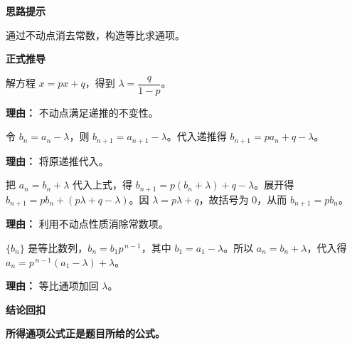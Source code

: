\begin{proofbox}
	\textbf{\textcolor{CProof}{思路提示}}

	通过不动点消去常数，构造等比求通项。

	\medskip
	\textbf{\textcolor{CProof}{正式推导}}
	\begin{description}[style=nextline, leftmargin=2.8em, labelsep=0.5em, itemsep=0.55em]
		\item[\textbf{步骤一（求不动点）：}] 解方程 $x = p x + q$，得到 $\lambda = \dfrac{q}{1-p}$。
			\par\textbf{理由：}
			不动点满足递推的不变性。

		\item[\textbf{步骤二（构造关系）：}] 令 $b_n = a_n - \lambda$，则 $b_{n+1} = a_{n+1} - \lambda$。代入递推得 $b_{n+1} = p a_n + q - \lambda$。
			\par\textbf{理由：}
			将原递推代入。

		\item[\textbf{步骤三（消常推导）：}] 把 $a_n = b_n + \lambda$ 代入上式，得 $b_{n+1} = p(b_n + \lambda) + q - \lambda$。展开得 $b_{n+1} = p b_n + (p\lambda + q - \lambda)$。因 $\lambda = p\lambda + q$，故括号为 $0$，从而 $b_{n+1} = p b_n$。
			\par\textbf{理由：}
			利用不动点性质消除常数项。

		\item[\textbf{步骤四（求通项）：}] $\{b_n\}$ 是等比数列，$b_n = b_1 p^{\,n-1}$，其中 $b_1 = a_1 - \lambda$。所以 $a_n = b_n + \lambda$，代入得 $a_n = p^{\,n-1}(a_1 - \lambda) + \lambda$。
			\par\textbf{理由：}
			等比通项加回 $\lambda$。
	\end{description}

	\medskip
	\textbf{\textcolor{CProof}{结论回扣}}

	\textbf{所得通项公式正是题目所给的公式。}
\end{proofbox}

